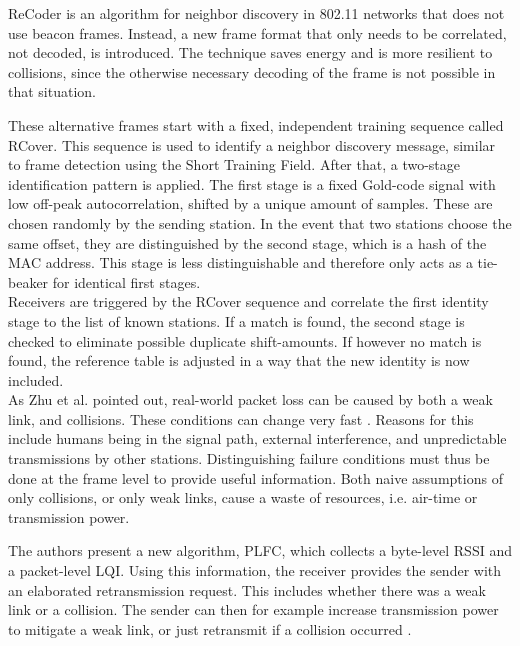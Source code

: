 ReCoder \cite{meng2015} is an algorithm for neighbor discovery in 802.11 networks that does not use beacon frames. Instead, a new frame format that only needs to be correlated, not decoded, is introduced. The technique saves energy and is more resilient to collisions, since the otherwise necessary decoding of the frame is not possible in that situation.

These alternative frames start with a fixed, independent training sequence called RCover. This sequence is used to identify a neighbor discovery message, similar to frame detection using the Short Training Field. After that, a two-stage identification pattern is applied. The first stage is a fixed Gold-code signal with low off-peak autocorrelation, shifted by a unique amount of samples. These are chosen randomly by the sending station. In the event that two stations choose the same offset, they are distinguished by the second stage, which is a hash of the \gls{MAC} address. This stage is less distinguishable and therefore only acts as a tie-beaker for identical first stages.\\

Receivers are triggered by the RCover sequence and correlate the first identity stage to the list of known stations. If a match is found, the second stage is checked to eliminate possible duplicate shift-amounts. If however no match is found, the reference table is adjusted in a way that the new identity is now included.\\

As Zhu et al. pointed out, real-world packet loss can be caused by both a weak link, and collisions. These conditions can change very fast \cite{zhu2015}. Reasons for this include humans being in the signal path, external interference, and unpredictable transmissions by other stations. Distinguishing failure conditions must thus be done at the frame level to provide useful information. Both naive assumptions of only collisions, or only weak links, cause a waste of resources, i.e. air-time or transmission power.

The authors present a new algorithm, \gls{PLFC}, which collects a byte-level \gls{RSSI} and a packet-level \gls{LQI}. Using this information, the receiver provides the sender with an elaborated retransmission request. This includes whether there was a weak link or a collision. The sender can then for example increase transmission power to mitigate a weak link, or just retransmit if a collision occurred \cite{zhu2015}.\\

